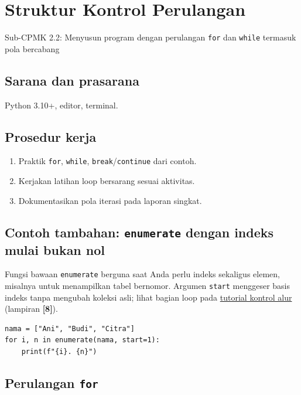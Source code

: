 ﻿\documentclass[../main.tex]{subfiles}
\begin{document}
\chapter{Struktur Kontrol Perulangan}

\begin{subcpmk}
  \item Sub-CPMK 2.2: Menyusun program dengan perulangan \texttt{for} dan \texttt{while} termasuk pola bercabang
\end{subcpmk}


\section{Sarana dan prasarana}

Python 3.10+, editor, terminal.

\section{Prosedur kerja}

\begin{enumerate}[leftmargin=*]
  \item Praktik \texttt{for}, \texttt{while}, \texttt{break}/\texttt{continue} dari contoh.
  \item Kerjakan latihan loop bersarang sesuai aktivitas.
  \item Dokumentasikan pola iterasi pada laporan singkat.
\end{enumerate}

\section{Contoh tambahan: \texttt{enumerate} dengan indeks mulai bukan nol}

\noindent Fungsi bawaan \texttt{enumerate} berguna saat Anda perlu indeks sekaligus elemen, misalnya untuk menampilkan tabel bernomor. Argumen \texttt{start} menggeser basis indeks tanpa mengubah koleksi asli; lihat bagian loop pada \href{https://docs.python.org/3/tutorial/controlflow.html}{tutorial kontrol alur} (lampiran \textbf{[8]}).

\begin{lstlisting}[caption=enumerate dengan start=1]
nama = ["Ani", "Budi", "Citra"]
for i, n in enumerate(nama, start=1):
    print(f"{i}. {n}")
\end{lstlisting}

\section{Perulangan \texttt{for}}
\end{document}
